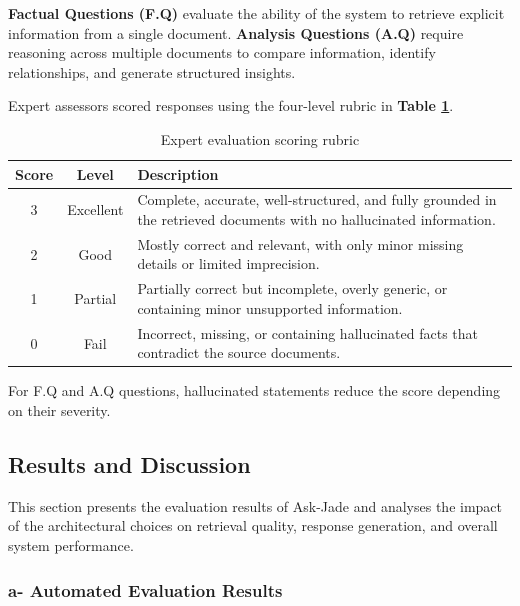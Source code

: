 \textbf{Factual Questions (F.Q)} evaluate the ability of the system
to retrieve explicit information from a single document. \textbf{Analysis
Questions (A.Q)} require reasoning across multiple documents to compare
information, identify relationships, and generate structured insights.


Expert assessors scored responses using the four-level rubric in
\textbf{Table \ref{tab:scoring_rubric}}.

\begin{table}[H]
\centering
\caption{Expert evaluation scoring rubric}
\label{tab:scoring_rubric}
\renewcommand{\arraystretch}{1.4}
\begin{tabular}{|c|c|p{9cm}|}
\hline
\textbf{Score} & \textbf{Level} & \textbf{Description} \\
\hline
3 & Excellent &
Complete, accurate, well-structured, and fully grounded in the retrieved
documents with no hallucinated information. \\
\hline
2 & Good &
Mostly correct and relevant, with only minor missing details or limited
imprecision. \\
\hline
1 & Partial &
Partially correct but incomplete, overly generic, or containing minor
unsupported information. \\
\hline
0 & Fail &
Incorrect, missing, or containing hallucinated facts that contradict
the source documents. \\
\hline
\end{tabular}
\end{table}

For F.Q and A.Q questions, hallucinated statements reduce
the score depending on their severity.

\subsection{Results and Discussion}

This section presents the evaluation results of Ask-Jade and analyses
the impact of the architectural choices on retrieval quality,
response generation, and overall system performance.

\subsubsection{a- Automated Evaluation Results}
\label{sec:ragas_results}

